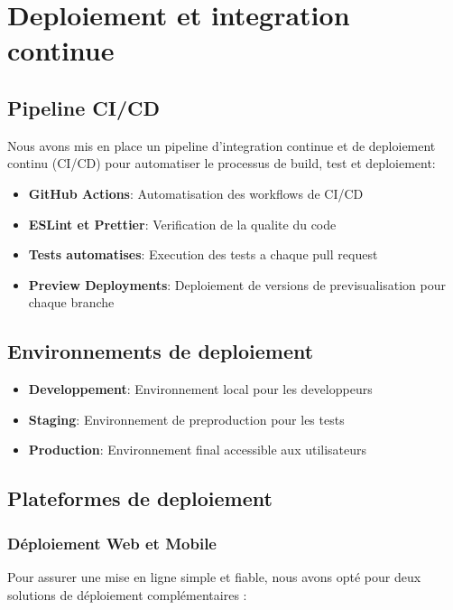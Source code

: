 \section{Deploiement et integration continue}
\subsection{Pipeline CI/CD}
Nous avons mis en place un pipeline d'integration continue et de deploiement continu (CI/CD) pour automatiser le processus de build, test et deploiement:

\begin{itemize}
    \item \textbf{GitHub Actions}: Automatisation des workflows de CI/CD
    \item \textbf{ESLint et Prettier}: Verification de la qualite du code
    \item \textbf{Tests automatises}: Execution des tests a chaque pull request
    \item \textbf{Preview Deployments}: Deploiement de versions de previsualisation pour chaque branche
\end{itemize}

\subsection{Environnements de deploiement}
\begin{itemize}
    \item \textbf{Developpement}: Environnement local pour les developpeurs
    \item \textbf{Staging}: Environnement de preproduction pour les tests
    \item \textbf{Production}: Environnement final accessible aux utilisateurs
\end{itemize}

\subsection{Plateformes de deploiement}


\subsubsection{Déploiement Web et Mobile}
Pour assurer une mise en ligne simple et fiable, nous avons opté pour deux solutions de déploiement complémentaires :

